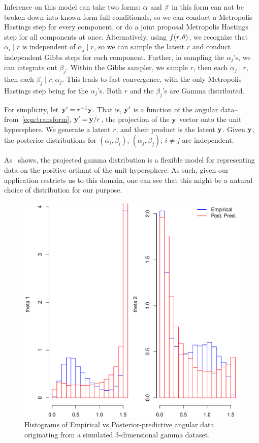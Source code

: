 Inference on this model can take two forms: ${\bf \alpha}$ and ${\bf \beta}$ in
  this form can not be broken down into known-form full conditionals, so we can
  conduct a Metropolis Hastings step for every component, or do a joint proposal
  Metropolis Hastings step for all components at once.  Alternatively, using
  $f(r,{\bf \theta})$, we recognize that $\alpha_i\mid r$ is independent of
  $\alpha_j\mid r$, so we can sample the latent $r$ and conduct independent
  Gibbs steps for each component.  Further, in sampling the $\alpha_j$'s, we can
  integrate out $\beta_j$. Within the Gibbs sampler, we sample $r$, then each
  $\alpha_j\mid r$, then each $\beta_j\mid r, \alpha_j$.  This leads to fast
  convergence, with the only Metropolis Hastings step being for the
  $\alpha_j$'s.  Both $r$ and the $\beta_j$'s are Gamma distributed.

For simplicity, let ${\bf y^{\prime}} = r^{-1}{\bf y}$.  That is,
  ${\bf y^{\prime}}$ is a function of the angular data--from~\eqref{eqn:transform},
  ${\bf y^{\prime}} = {\bf y}/r$, the projection of the ${\bf y}$ vector onto
  the unit hypersphere. We generate a latent $r$, and their product is the
  latent ${\bf y}$.  Given ${\bf y}$, the posterior distributions for
  $(\alpha_i, \beta_i)$, $(\alpha_j,\beta_j)$, $i\neq j$ are independent.

As~\cite{nunez2019} shows, the projected gamma distribution is a flexible model
  for representing data on the positive orthant of the unit hypersphere.  As such,
  given our application restricts us to this domain, one can see that this might be a
  natural choice of distribution for our purpose.

\begin{figure}[h!]
  \centering
  \label{fig:vanillamix}
  \includegraphics[width=5in]{./images/justification_for_more_complex_models}
  \caption{Histograms of Empirical vs Posterior-predictive angular data originating
            from a simulated 3-dimensional gamma dataset.}
\end{figure}

